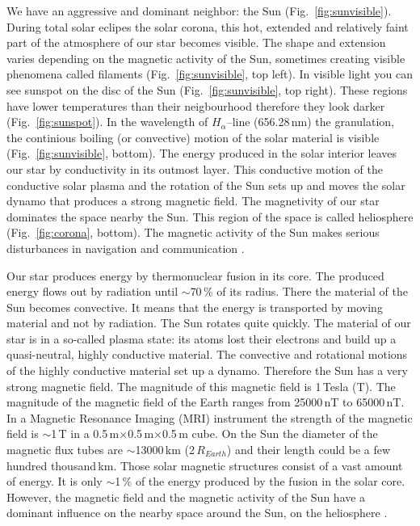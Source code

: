 \documentclass[sn-aps]{sn-jnl}%
\begin{document}
We have an aggressive and dominant neighbor: the Sun (Fig.~\ref{fig:sunvisible}). During total solar eclipes the solar corona, this hot, extended and relatively faint part of the atmosphere of our star becomes visible. The shape and extension varies depending on the magnetic activity of the Sun, sometimes creating visible phenomena called filaments (Fig.~\ref{fig:sunvisible}, top left). In visible light you can see sunspot on the disc of the Sun (Fig.~\ref{fig:sunvisible}, top right). These regions have lower temperatures than their neigbourhood therefore they look darker (Fig.~\ref{fig:sunspot}). In the wavelength of $H_{\alpha}$--line (656.28\,nm) the granulation, the continious boiling (or convective) motion of the solar material is visible (Fig.~\ref{fig:sunvisible}, bottom). The energy produced in the solar interior leaves our star by conductivity in its outmost layer. This conductive motion of the conductive solar plasma and the rotation of the Sun sets up and moves the solar dynamo that produces a strong magnetic field. The magnetivity of our star dominates the space nearby the Sun. This region of the space is called heliosphere (Fig.~\ref{fig:corona}, bottom). The magnetic activity of the Sun makes serious disturbances in navigation and communication \cite{scherer05:_space_weath,stix04:_sun_introd}. 

Our star produces energy by thermonuclear fusion in its core. The produced energy flows out by radiation until $\sim$70\,\% of its radius. There the material of the Sun becomes convective. It means that the energy is transported by moving material and not by radiation. The Sun rotates quite quickly. The material of our star is in a so-called plasma state: its atoms lost their electrons and build up a quasi-neutral, highly conductive material. The convective and rotational motions of the highly conductive material set up a dynamo. Therefore the Sun has a very strong magnetic field. The magnitude of this magnetic field is 1\,Tesla (T). The magnitude of the magnetic field of the Earth ranges from 25000\,nT to 65000\,nT. In a Magnetic Resonance Imaging (MRI) instrument the strength of the magnetic field is $\sim$1\,T in a 0.5\,m$\times$0.5\,m$\times$0.5\,m cube. On the Sun the diameter of the magnetic flux tubes are $\sim$13000\,km (2\,$R_{Earth}$) and their length could be a few hundred thousand\,km. Those solar magnetic structures consist of a vast amount of energy. It is only $\sim$1\,\% of the energy produced by the fusion in the solar core. However, the magnetic field and the magnetic activity of the Sun have a dominant influence on the nearby space around the Sun, on the heliosphere \cite{scherer05:_space_weath,stix04:_sun_introd}.
\end{document}
